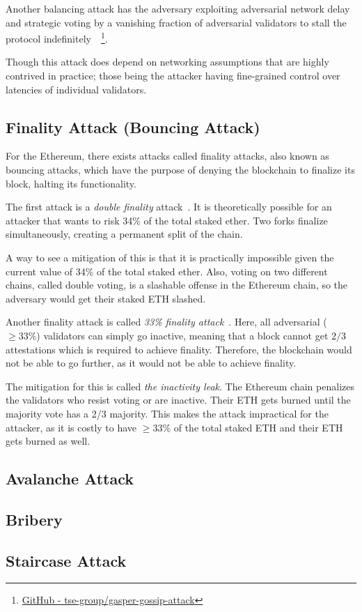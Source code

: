 Another balancing attack has the adversary
exploiting adversarial network delay
and strategic voting by a vanishing fraction of adversarial validators
to stall the protocol indefinitely~\cite{10.1007/978-3-031-18283-9_28}~\footnote{
\href{https://github.com/tse-group/gasper-gossip-attack}{GitHub - tse-group/gasper-gossip-attack}}.

Though this attack does depend on networking assumptions that are highly contrived in practice; those being the attacker having fine-grained control over latencies of individual validators.

\subsection{Finality Attack (Bouncing Attack)}\label{subsec:finality-attack-(bouncing-attack)}
For the Ethereum, there exists attacks called finality attacks, also known as bouncing attacks, which have the purpose of denying the blockchain to finalize its block, halting its functionality.

The first attack is a \textit{double finality} attack~\cite{EthereumAttackDefense2024, 10646904}.
It is theoretically possible for an attacker that wants to risk 34\% of the total staked ether.
Two forks finalize simultaneously, creating a permanent split of the chain.

A way to see a mitigation of this is that it is practically impossible given the current value of 34\% of the total staked ether.
Also, voting on two different chains, called double voting, is a slashable offense in the Ethereum chain, so the adversary would get their staked ETH slashed.


Another finality attack is called \textit{33\% finality attack}~\cite{EthereumAttackDefense2024}.
Here, all adversarial ($\geq33\%$) validators can simply go inactive, meaning that a block cannot get $2/3$ attestations which is required to achieve finality.
Therefore, the blockchain would not be able to go further, as it would not be able to achieve finality.

The mitigation for this is called \textit{the inactivity leak}.
The Ethereum chain penalizes the validators who resist voting or are inactive.
Their ETH gets burned until the majority vote has a 2/3 majority.
This makes the attack impractical for the attacker, as it is costly to have $\geq33\%$ of the total staked ETH and their ETH gets burned as well.

\subsection{Avalanche Attack}\label{subsec:avalanche-attack}

\subsection{Bribery}\label{subsec:bribery}

\subsection{Staircase Attack}\label{subsec:staircase-attack}